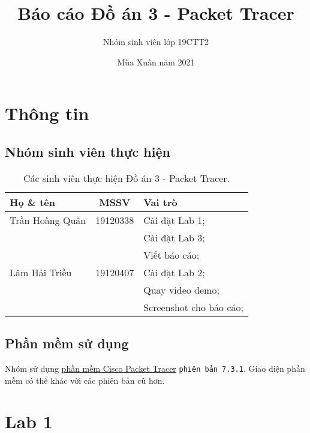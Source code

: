 \documentclass[]{article}
\title{Báo cáo Đồ án 3 - Packet Tracer}
\author{Nhóm sinh viên lớp 19CTT2}
\date{Mùa Xuân năm 2021}
\begin{document}
\maketitle
\tableofcontents
\listoftables
\pagebreak

\section{Thông tin}
\subsection{Nhóm sinh viên thực hiện}
\begin{table}[ht]
    \centering
    \caption{Các sinh viên thực hiện Đồ án 3 - Packet Tracer.}
    \begin{tabular}[t]{lcl}
        \toprule
        Họ \& tên&MSSV&Vai trò\\
        \midrule
        Trần Hoàng Quân&19120338&Cài đặt Lab 1;\\
        &&Cài đặt Lab 3;\\
        &&Viết báo cáo;\\
        Lâm Hải Triều&19120407&Cài đặt Lab 2;\\
        &&Quay video demo;\\
        &&Screenshot cho báo cáo;\\
        \bottomrule
    \end{tabular}
\end{table}

\subsection{Phần mềm sử dụng}
Nhóm sử dụng \href{https://www.netacad.com/courses/packet-tracer}{phần mềm Cisco Packet Tracer} \texttt{phiên bản 7.3.1}. Giao diện phần mềm có thể khác với các phiên bản cũ hơn.

\section{Lab 1}
\end{document}
